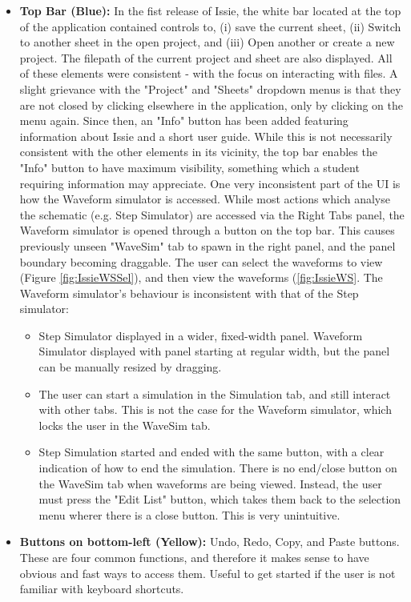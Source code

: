 \begin{itemize}
    \item[] \textbf{Top Bar (Blue):} In the fist release of Issie, the white bar located at the top of the  application contained controls to, (i) save the current sheet, (ii) Switch to another sheet in the open project, and (iii) Open another or create a new project. The filepath of the current project and sheet are also displayed. All of these elements were consistent - with the focus on interacting with files. A slight grievance with the "Project" and "Sheets" dropdown menus is that they are not closed by clicking elsewhere in the application, only by clicking on the menu again. Since then, an "Info" button has been added featuring information about Issie and a short user guide. While this is not necessarily consistent with the other elements in its vicinity, the top bar enables the "Info" button to have maximum visibility, something which a student requiring information may appreciate. One very inconsistent part of the UI is how the Waveform simulator is accessed. While most actions which analyse the schematic (e.g. Step Simulator) are accessed via the Right Tabs panel, the Waveform simulator is opened through a button on the top bar. This causes previously unseen "WaveSim" tab to spawn in the right panel, and the panel boundary becoming draggable. The user can select the waveforms to view (Figure \ref{fig:IssieWSSel}), and then view the waveforms (\ref{fig:IssieWS}. The Waveform simulator's behaviour is inconsistent with that of the Step simulator:
    \begin{itemize}
        \item Step Simulator displayed in a wider, fixed-width panel. Waveform Simulator displayed with panel starting at regular width, but the panel can be manually resized by dragging.
        \item The user can start a simulation in the Simulation tab, and still interact with other tabs. This is not the case for the Waveform simulator, which locks the user in the WaveSim tab.
        \item Step Simulation started and ended with the same button, with a clear indication of how to end the simulation. There is no end/close button on the WaveSim tab when waveforms are being viewed. Instead, the user must press the "Edit List" button, which takes them back to the selection menu wherer there is a close button. This is very unintuitive.
    \end{itemize}
    \item[] \textbf{Buttons on bottom-left (Yellow):} Undo, Redo, Copy, and Paste buttons. These are four common functions, and therefore it makes sense to have obvious and fast ways to access them. Useful to get started if the user is not familiar with keyboard shortcuts.
\end{itemize}

